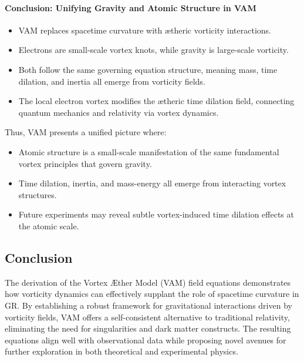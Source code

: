 \paragraph{Conclusion: Unifying Gravity and Atomic Structure in VAM}
\begin{itemize}
    \item VAM replaces spacetime curvature with ætheric vorticity interactions.
    \item Electrons are small-scale vortex knots, while gravity is large-scale vorticity.
    \item Both follow the same governing equation structure, meaning mass, time dilation, and inertia all emerge from vorticity fields.
    \item The local electron vortex modifies the ætheric time dilation field, connecting quantum mechanics and relativity via vortex dynamics.
\end{itemize}
Thus, VAM presents a unified picture where:
\begin{itemize}
    \item Atomic structure is a small-scale manifestation of the same fundamental vortex principles that govern gravity.
    \item Time dilation, inertia, and mass-energy all emerge from interacting vortex structures.
    \item Future experiments may reveal subtle vortex-induced time dilation effects at the atomic scale.
\end{itemize}

\subsection{Conclusion}
The derivation of the Vortex Æther Model (VAM) field equations demonstrates how vorticity dynamics can effectively supplant the role of spacetime curvature in GR. By establishing a robust framework for gravitational interactions driven by vorticity fields, VAM offers a self-consistent alternative to traditional relativity, eliminating the need for singularities and dark matter constructs. The resulting equations align well with observational data while proposing novel avenues for further exploration in both theoretical and experimental physics.